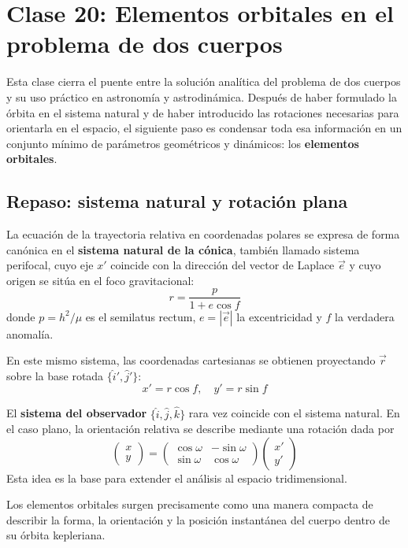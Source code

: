 \chapter{Clase 20: Elementos orbitales en el problema de dos cuerpos}

Esta clase cierra el puente entre la solución analítica del problema de dos cuerpos y su uso práctico en astronomía y astrodinámica. Después de haber formulado la órbita en el sistema natural y de haber introducido las rotaciones necesarias para orientarla en el espacio, el siguiente paso es condensar toda esa información en un conjunto mínimo de parámetros geométricos y dinámicos: los \textbf{elementos orbitales}.

\section{Repaso: sistema natural y rotación plana}
La ecuación de la trayectoria relativa en coordenadas polares se expresa de forma canónica en el \textbf{sistema natural de la cónica}, también llamado sistema perifocal, cuyo eje \(x'\) coincide con la dirección del vector de Laplace \(\vec{e}\) y cuyo origen se sitúa en el foco gravitacional:
\[
 r = \frac{p}{1 + e\cos f}
\]
donde \(p = h^2/\mu\) es el semilatus rectum, \(e = |\vec{e}|\) la excentricidad y \(f\) la verdadera anomalía.

En este mismo sistema, las coordenadas cartesianas se obtienen proyectando \(\vec{r}\) sobre la base rotada \(\{\hat{i}', \hat{j}'\}\):
\[
 x' = r\cos f, \quad y' = r\sin f
\]

El \textbf{sistema del observador} \(\{\hat{i}, \hat{j}, \hat{k}\}\) rara vez coincide con el sistema natural. En el caso plano, la orientación relativa se describe mediante una rotación dada por
\[
\begin{pmatrix} x \\ y \end{pmatrix} =
\begin{pmatrix}
\cos\omega & -\sin\omega \\
\sin\omega & \cos\omega
\end{pmatrix}
\begin{pmatrix} x' \\ y' \end{pmatrix}
\]
Esta idea es la base para extender el análisis al espacio tridimensional.

\begin{importante}
Los elementos orbitales surgen precisamente como una manera compacta de describir la forma, la orientación y la posición instantánea del cuerpo dentro de su órbita kepleriana.
\end{importante}


